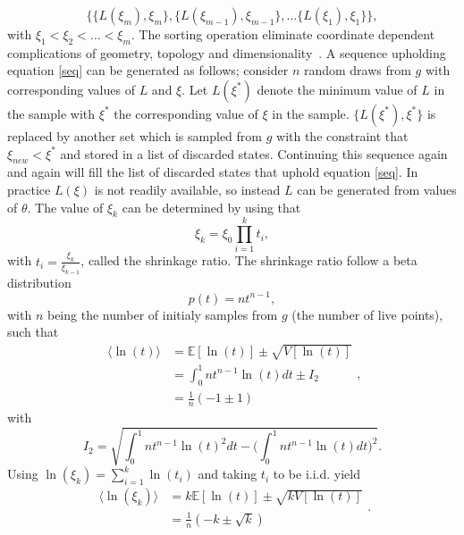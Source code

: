 \begin{equation}
	\{\{L(\xi_m),\xi_m\},\{L(\xi_{m-1}),\xi_{m-1}\},\dots\{L(\xi_1),\xi_1\}\},
	\label{seq}
\end{equation}
with $\xi_1<\xi_2<\dots <\xi_m$. The sorting operation eliminate coordinate dependent complications of geometry, topology and dimensionality~\citep{skilling2006}. A sequence upholding equation \eqref{seq} can be generated as follows; consider $n$ random draws from $g$ with corresponding values of $L$ and $\xi$. Let $L(\xi^*)$ denote the minimum value of $L$ in the sample with $\xi^*$ the corresponding value of $\xi$ in the sample. $\{L(\xi^*), \xi^*\}$ is replaced by another set which is sampled from $g$ with the constraint that $\xi_{new}<\xi^*$ and stored in a list of discarded states. Continuing this sequence again and again will fill the list of discarded states that uphold equation \eqref{seq}. In practice $L(\xi)$ is not readily available, so instead $L$ can be generated from values of $\theta$. The value of $\xi_k$ can be determined by using that~\citep{skilling2004}
\begin{equation}
	\xi_k=\xi_0\prod_{i=1}^{k}t_i,
\end{equation}
with $t_i=\frac{\xi_k}{\xi_{k-1}}$, called the shrinkage ratio. The shrinkage ratio follow a beta distribution
\begin{equation}
	p(t)=nt^{n-1},
\end{equation}
with $n$ being the number of initialy samples from $g$ (the number of live points), such that 
\begin{equation}
	\begin{split}
		\langle\ln(t)\rangle&=\mathbb{E}[\ln(t)]\pm \sqrt{V[\ln(t)]}\\
		&=\int_0^1 nt^{n-1}\ln(t)dt\pm I_2\\
		&=\frac{1}{n}(-1\pm 1)
	\end{split},
\end{equation}
with 
\begin{equation}
	I_2 = \sqrt{\int_0^1nt^{n-1}\ln(t)^2dt-\bigg(\int_0^1nt^{n-1}\ln(t)dt\bigg)^2}.
\end{equation}
Using $\ln(\xi_k)=\sum_{i=1}^k\ln(t_i)$ and taking $t_i$ to be i.i.d. yield
\begin{equation}
	\begin{split}
		\langle\ln(\xi_k)\rangle&=k\mathbb{E}[\ln(t)]\pm \sqrt{kV[\ln(t)]}\\
		&=\frac{1}{n}(-k\pm \sqrt{k})
	\end{split}.
	\label{eqln}
\end{equation}

